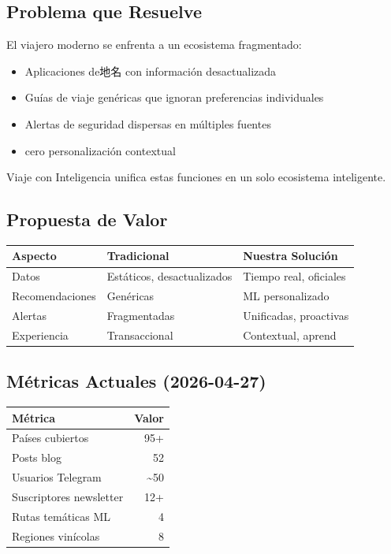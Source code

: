 \documentclass[11pt]{article}
\begin{document}
\subsection{Problema que Resuelve}
\label{sec:orga0928bf}

El viajero moderno se enfrenta a un ecosistema fragmentado:
\begin{itemize}
\item Aplicaciones de地名 con información desactualizada
\item Guías de viaje genéricas que ignoran preferencias individuales
\item Alertas de seguridad dispersas en múltiples fuentes
\item cero personalización contextual
\end{itemize}

Viaje con Inteligencia unifica estas funciones en un solo ecosistema inteligente.

\subsection{Propuesta de Valor}
\label{sec:orgddc39ea}

\begin{center}
\begin{tabular}{lll}
Aspecto & Tradicional & Nuestra Solución\\
\hline
Datos & Estáticos, desactualizados & Tiempo real, oficiales\\
Recomendaciones & Genéricas & ML personalizado\\
Alertas & Fragmentadas & Unificadas, proactivas\\
Experiencia & Transaccional & Contextual, aprend\\
\end{tabular}
\end{center}

\subsection{Métricas Actuales (2026-04-27)}
\label{sec:org5c71dd6}

\begin{center}
\begin{tabular}{lr}
Métrica & Valor\\
\hline
Países cubiertos & 95+\\
Posts blog & 52\\
Usuarios Telegram & \textasciitilde{}50\\
Suscriptores newsletter & 12+\\
Rutas temáticas ML & 4\\
Regiones vinícolas & 8\\
\end{tabular}
\end{center}
\end{document}
